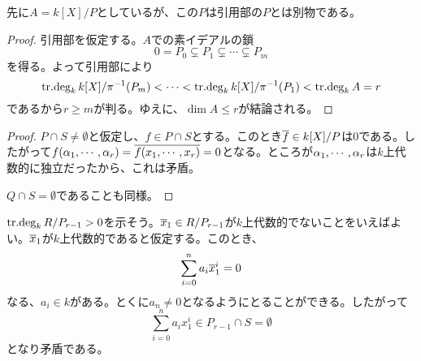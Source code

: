 ﻿


\begin{rem}
先に$A = k[X]/P$としているが、この$P$は引用部の$P$とは別物である。
\end{rem}
\begin{proof}
  引用部を仮定する。$A$での素イデアルの鎖
  \[
  0=P_0 \subsetneq P_1 \subsetneq \cdots \subsetneq P_m
  \]
  を得る。よって引用部により
  \[
  \operatorname{tr\text{.}deg}_k k[X]/\pi^{-1}(P_m) < \cdots < \operatorname{tr\text{.}deg}_k k[X]/\pi^{-1}(P_1) < \operatorname{tr\text{.}deg}_k A = r
  \]
  であるから$r \geq m$が判る。ゆえに、$\dim A \leq r$が結論される。
\end{proof}



\begin{proof}
  $P \cap S \neq \emptyset$と仮定し、$f \in P \cap S$とする。このとき$\overline{f} \in k[X]/P$は$0$である。したがって$f({\alpha}_1, \cdots , {\alpha}_r)=\overline{f(x_1, \cdots, x_r)} = 0$となる。ところが${\alpha}_1, \cdots , {\alpha}_r$は$k$上代数的に独立だったから、これは矛盾。

  $Q \cap S = \emptyset$であることも同様。
\end{proof}



\begin{rem}
  $\operatorname{tr\text{.}deg}_k R/P_{r-1} > 0$を示そう。$\overline{x}_1 \in R/P_{r-1}$が$k$上代数的でないことをいえばよい。$\overline{x}_1$が$k$上代数的であると仮定する。このとき、
  \[
  \sum_{i=0}^n a_i \overline{x}_1^i =0
  \]
  なる、$a_i \in k$がある。とくに$a_n \neq 0$となるようにとることができる。したがって
  \[
    \sum_{i=0}^n a_i x_1^i \in P_{r-1} \cap S = \emptyset
  \]
  となり矛盾である。
\end{rem}
